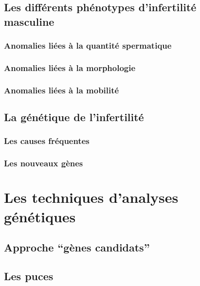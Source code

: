 \documentclass[12pt,twoside]{ugathesis}
\begin{document}
\subsection{Les différents phénotypes d'infertilité
masculine}\label{les-differents-phenotypes-dinfertilite-masculine}

\subsubsection{Anomalies liées à la quantité
spermatique}\label{infquant}

\subsubsection{Anomalies liées à la
morphologie}\label{anomalies-liees-a-la-morphologie}

\subsubsection{Anomalies liées à la
mobilité}\label{anomalies-liees-a-la-mobilite}

\subsection{La génétique de
l'infertilité}\label{la-genetique-de-linfertilite}

\subsubsection{Les causes fréquentes}\label{les-causes-frequentes}

\subsubsection{Les nouveaux gènes}\label{les-nouveaux-genes}

\section{Les techniques d'analyses
génétiques}\label{les-techniques-danalyses-genetiques}

\subsection{\texorpdfstring{Approche ``gènes
candidats''}{Approche gènes candidats}}\label{approche-genes-candidats}

\subsection{Les puces}\label{les-puces}
\end{document}
